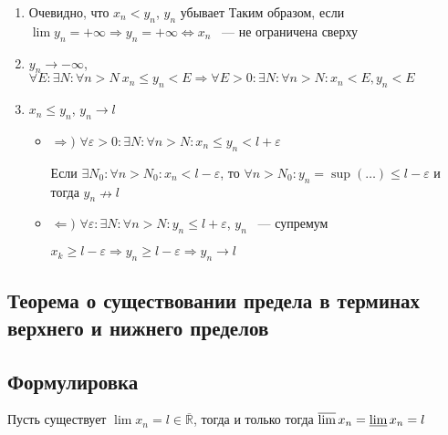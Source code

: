\documentclass[../main.tex]{subfiles}
\begin{document}
            \begin{enumerate}
            
                \item Очевидно, что $x_n < y_n$, $y_n$ убывает Таким образом, если $\lim y_n = +\infty \Longrightarrow y_n = +\infty \Longleftrightarrow x_n$ ~--- не ограничена сверху
                
                \item $y_n \rightarrow -\infty$, $\forall E : \exists N : \forall n > N \ x_n \leq y_n < E \Rightarrow \forall E > 0 : \exists N : \forall n > N : x_n < E, y_n < E$
                
                \item $x_n \leq y_n$, $y_n \rightarrow l$
                
                \begin{itemize}
                
                    \item $\Rightarrow)$ $\forall \varepsilon > 0 : \exists N : \forall n > N : x_n \leq y_n < l + \varepsilon$
                    
                        Если $\exists N_0 : \forall n > N_0 : x_n < l - \varepsilon$, то $\forall n > N_0 : y_n = \sup(\ldots) \leq l - \varepsilon$ и тогда $y_n \nrightarrow l$
                        
                    \item $\Leftarrow)$ $\forall \varepsilon : \exists N : \forall n > N : y_n \leq l + \varepsilon$, $y_n$ ~--- супремум
                    
                        $x_k \geq l - \varepsilon \Rightarrow y_n \geq l - \varepsilon \Rightarrow y_n \rightarrow l$
                        
                \end{itemize}
                
            \end{enumerate}
\newpage


\subsection{Теорема о существовании предела в терминах верхнего и нижнего пределов}
\subsection*{Формулировка}
        
            Пусть существует $\lim x_n = l \in \overline{\mathbb{R}}$, тогда и только тогда $\varlimsup x_n = \varliminf x_n = l$
            
\end{document}
